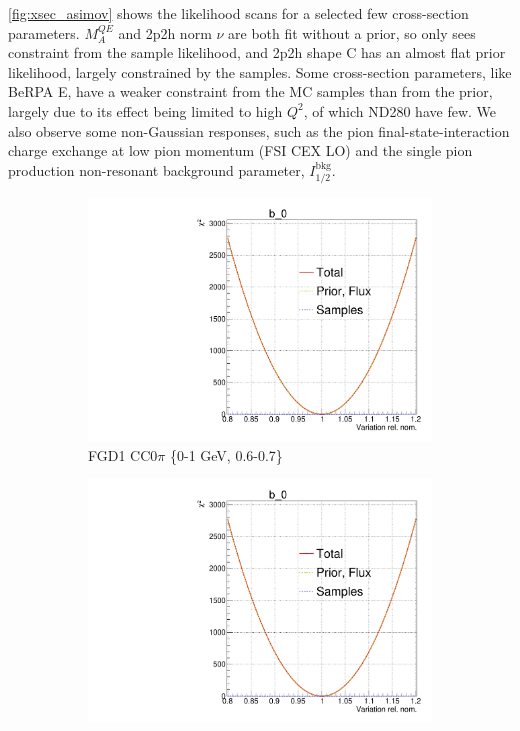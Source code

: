 \autoref{fig:xsec_asimov} shows the likelihood scans for a selected few cross-section parameters. $M_A^{QE}$ and 2p2h norm $\nu$ are both fit without a prior, so only sees constraint from the sample likelihood, and 2p2h shape C has an almost flat prior likelihood, largely constrained by the samples. Some cross-section parameters, like BeRPA E, have a weaker constraint from the MC samples than from the prior, largely due to its effect being limited to high $Q^2$, of which ND280 have few. We also observe some non-Gaussian responses, such as the pion final-state-interaction charge exchange at low pion momentum (FSI CEX LO) and the single pion production non-resonant background parameter, $I_{1/2}^\text{bkg}$.
\begin{figure}[!h]
	\centering
	\begin{subfigure}[t]{0.32\textwidth}
		\includegraphics[width=\textwidth, trim={0mm 0mm 0mm 11mm}, clip,page=132]{figures/mach3/Asimov/Full_LLHscan_18July_BeRPA_U_ND280logL_scan}
		\caption{FGD1 CC0$\pi$ 	\{0-1 GeV, 0.6-0.7\}}
	\end{subfigure}
	\begin{subfigure}[t]{0.32\textwidth}
		\includegraphics[width=\textwidth, trim={0mm 0mm 0mm 11mm}, clip,page=239]{figures/mach3/Asimov/Full_LLHscan_18July_BeRPA_U_ND280logL_scan}

\end{subfigure}
\end{figure}
